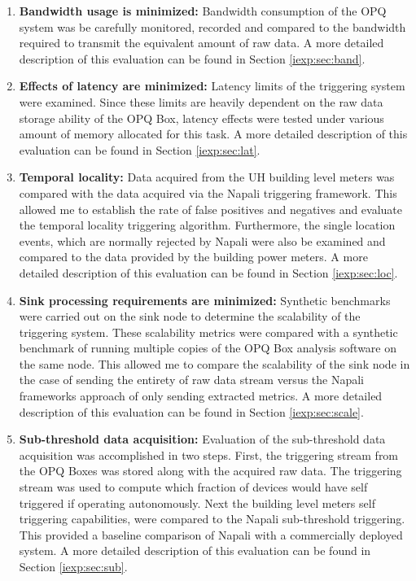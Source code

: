 \begin{enumerate}
    \item \textbf{Bandwidth usage is minimized:} Bandwidth consumption of the OPQ system was be carefully monitored, recorded and compared to the bandwidth required to transmit the equivalent amount of raw data.
    A more detailed description of this evaluation can be found in Section \ref{iexp:sec:band}.

    \item \textbf{Effects of latency are minimized:}  Latency limits of the triggering system were examined.
    Since these limits are heavily dependent on the raw data storage ability of the OPQ Box, latency effects were tested under various amount of memory allocated for this task.
    A more detailed description of this evaluation can be found in Section \ref{iexp:sec:lat}.

    \item \textbf{Temporal locality:} Data acquired from the UH building level meters was compared with the data acquired via the Napali triggering framework.
    This allowed me to establish the rate of false positives and negatives and evaluate the temporal locality triggering algorithm.
    Furthermore, the single location events, which are normally rejected by Napali were also be examined and compared to the data provided by the building power meters.
    A more detailed description of this evaluation can be found in Section \ref{iexp:sec:loc}.

    \item \textbf{Sink processing requirements are minimized:} Synthetic benchmarks were carried out on the sink node to determine the scalability of the triggering system.
    These scalability metrics were compared with a synthetic benchmark of running multiple copies of the OPQ Box analysis software on the same node.
    This allowed me to compare the scalability of the sink node in the case of sending the entirety of raw data stream versus the Napali frameworks approach of only sending extracted metrics.
    A more detailed description of this evaluation can be found in Section \ref{iexp:sec:scale}.

    \item \textbf{Sub-threshold data acquisition:} Evaluation of the sub-threshold data acquisition was accomplished in two steps.
    First, the triggering stream from the OPQ Boxes was stored along with the acquired raw data.
    The triggering stream was used to compute which fraction of devices would have self triggered if operating autonomously.
    Next the building level meters self triggering capabilities, were compared to the Napali sub-threshold triggering.
    This provided a baseline comparison of Napali with a commercially deployed system.
    A more detailed description of this evaluation can be found in Section \ref{iexp:sec:sub}.

\end{enumerate}
